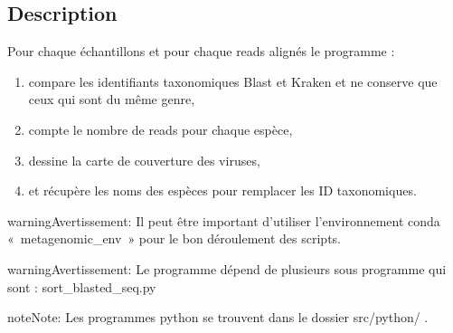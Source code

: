 \documentclass[letterpaper,10pt,french]{sphinxmanual}
\begin{document}
\subsection{Description}
\label{\detokenize{bash/find_same_id_kraken_blast_bacteria.sh:description}}
Pour chaque échantillons et pour chaque reads alignés le programme :
\begin{enumerate}
%
\item {} 
compare les identifiants taxonomiques Blast et Kraken et ne conserve que ceux qui sont du même genre,

\item {} 
compte le nombre de reads pour chaque espèce,

\item {} 
dessine la carte de couverture des viruses,

\item {} 
et récupère les noms des espèces pour remplacer les ID taxonomiques.

\end{enumerate}

\begin{sphinxadmonition}{warning}{Avertissement:}
Il peut être important d’utiliser l’environnement conda « metagenomic\_env » pour le bon déroulement des scripts.
\end{sphinxadmonition}

\begin{sphinxadmonition}{warning}{Avertissement:}
Le programme dépend de plusieurs sous programme qui sont :
sort\_blasted\_seq.py
\end{sphinxadmonition}

\begin{sphinxadmonition}{note}{Note:}
Les programmes python se trouvent dans le dossier src/python/ .
\end{sphinxadmonition}
\end{document}
